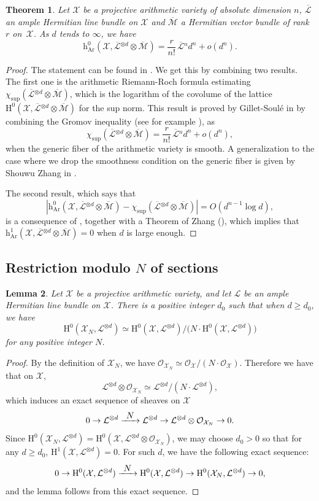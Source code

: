 \documentclass[11pt]{article}
\newcommand{\Subsection}{\subsection}
\numberwithin{equation}{section}
\newcommand{\To}[1]{\mathchoice{\xrightarrow{\textstyle\kern4pt#1\kern3pt}}{\stackrel{#1}{\longrightarrow}}{}{}}
\theoremstyle{plain}
\newtheorem{thm}{Theorem}[section]
\newtheorem{lem}[thm]{Lemma}
\theoremstyle{definition}
\newcommand{\ho}{\mathrm{H}}
\newcommand{\X}{\mathcal{X}}
\newcommand{\Li}{\overline{\mathcal{L}}{}}
\newcommand{\li}{\mathcal{L}}
\begin{document}
\begin{thm}\label{hilbsamu}
Let $\X$ be a projective arithmetic variety of absolute dimension $n$, $\Li$ an ample Hermitian line bundle on $\X$ and $\overline{\mathcal{M}}$ a Hermitian vector bundle of rank~$r$ on~$\X$. As $d$ tends to $\infty$, we have
\[
\mathrm{h}^0_{\mathrm{Ar}}(\X,\Li^{\otimes d}\otimes \overline{\mathcal{M}})= \frac{r}{n!}\,\Li^{n} d^n+o(d^n).
\]
\end{thm}
\begin{proof}[Proof]
The statement can be found in \cite[Cor.\,2.7 (1)]{Yu08}. We get this by combining two results. The first one is the arithmetic Riemann-Roch formula esti\-ma\-ting $\chi_{\mathrm{sup}}(\Li^{\otimes d}\otimes \overline{\mathcal{M}})$, which is the logarithm of the covolume of the lattice \hbox{$\ho^0(\X, \Li^{\otimes d}\otimes \overline{\mathcal{M}})$} for the sup norm. This result is proved by Gillet-Soulé in \cite{GS92} by combining the Gromov inequality (see for example \cite[Cor.\,2.7 (2)]{Yu08}), as
\[
\chi_{\mathrm{sup}}(\Li^{\otimes d}\otimes \overline{\mathcal{M}})=\frac{r}{n!}\,\Li^{n} d^n+o(d^n),
\]
when the generic fiber of the arithmetic variety is smooth. A generalization to the case where we drop the smoothness condition on the generic fiber is given by Shouwu Zhang in \cite[Th.\,(1.4)]{Zh95}.

The second result, which says that
\[
|\mathrm{h}^0_{\mathrm{Ar}}(\X,\Li^{\otimes d}\otimes \overline{\mathcal{M}})-\chi_{\mathrm{sup}}(\Li^{\otimes d}\otimes \overline{\mathcal{M}})|
=O(d^{n-1}\log d),
\]
is a consequence of \cite[Th.\,2]{GS91}, together with a Theorem of Zhang (\cite[Th.\,4.2]{Zh95}), which implies that $\mathrm{h}^1_{\mathrm{Ar}}(\X,\Li^{\otimes d}\otimes \overline{\mathcal{M}})=0$ when $d$ is large enough.
\end{proof}

\Subsection{Restriction modulo \texorpdfstring{$N$}{N} of sections}\label{arithample2}

\begin{lem}\label{freemod}
Let $\X$ be a projective arithmetic variety, and let $\li$ be an ample Hermitian line bundle on $\X$. There is a positive integer $d_0$ such that when $d\geq d_0$, we have
\[
\ho^0(\X_N,\li^{\otimes d})\simeq\ho^0(\X,\li^{\otimes d})/\big(N\cdot \ho^0(\X,\li^{\otimes d})\big)
\]
for any positive integer $N$.
\end{lem}
\begin{proof}[Proof]
By the definition of $\X_N$, we have $\mathcal{O}_{\X_N}\simeq \mathcal{O}_{\X}/(N\cdot \mathcal{O}_{\X})$. Therefore we have that on $\X$,
\[
\li^{\otimes d}\otimes \mathcal{O}_{\X_N}\simeq \li^{\otimes d}/(N\cdot \li^{\otimes d}),
\]
which induces an exact sequence of sheaves on $\X$
\[
0\to \li^{\otimes d}\To{N} \li^{\otimes d}\to \li^{\otimes d}\otimes \mathcal{O}_{\X_N}\to 0.
\]
Since $\ho^0(\X_N,\li^{\otimes d})=\ho^0(\X,\li^{\otimes d}\otimes \mathcal{O}_{\X_N})$, we may choose $d_0>0$ so that for any $d\geq d_0$, $\ho^1(\X,\li^{\otimes d})=0$. For such $d$, we have the following exact sequence:
\[
0\to \ho^0(\X,\li^{\otimes d})\To{N}\ho^0(\X,\li^{\otimes d})\to \ho^0(\X_N,\li^{\otimes d})\to 0,
\]
and the lemma follows from this exact sequence.
\end{proof}
\end{document}
